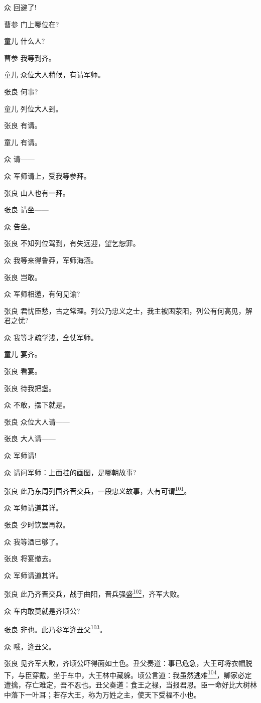 众 回避了!

曹参 门上哪位在?

童儿 什么人?

曹参 我等到齐。

童儿 众位大人稍候，有请军师。

张良 何事?

童儿 列位大人到。

张良 有请。

童儿 有请。

众 请------

众 军师请上，受我等参拜。

张良 山人也有一拜。

张良 请坐------

众 告坐。

张良 不知列位驾到，有失远迎，望乞恕罪。

众 我等来得鲁莽，军师海涵。

张良 岂敢。

众 军师相邀，有何见谕?

张良
君忧臣愁，古之常理。列公乃忠义之士，我主被困荥阳，列公有何高见，解君之忧?

众 我等才疏学浅，全仗军师。

童儿 宴齐。

张良 看宴。

张良 待我把盏。

众 不敢，摆下就是。

张良 众位大人请------

张良 大人请------

众 军师请!

众 请问军师：上面挂的画图，是哪朝故事?

张良
此乃东周列国齐晋交兵，一段忠义故事，大有可谓\protect\hyperlink{fn101}{\textsuperscript{101}}。

众 军师请道其详。

张良 少时饮罢再叙。

众 我等酒已够了。

张良 将宴撤去。

众 军师请道其详。

张良
此乃齐晋交兵，战于曲阳，晋兵强盛\protect\hyperlink{fn102}{\textsuperscript{102}}，齐军大败。

众 车内敢莫就是齐顷公?

张良
非也。此乃参军逄丑父\protect\hyperlink{fn103}{\textsuperscript{103}}。

众 哦，逄丑父。

张良
见齐军大败，齐顷公吓得面如土色。丑父奏道：事已危急，大王可将衣帽脱下，与臣穿戴，坐于车中，大王林中藏躲。顷公言道：我虽然逃难\protect\hyperlink{fn104}{\textsuperscript{104}}，卿家必定遭擒，存亡难定，吾不忍也。丑父奏道：食王之禄，当报君恩。臣一命好比大树林中落下一叶耳；若存大王，称为万姓之主，使天下受福不小也。


